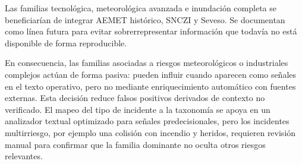 Las familias tecnológica, meteorológica avanzada e inundación completa se beneficiarían
de integrar AEMET histórico, SNCZI y Seveso. Se documentan como
línea futura para evitar sobrerrepresentar información que todavía no está disponible
de forma reproducible.

En consecuencia, las familias asociadas a riesgos meteorológicos o industriales
complejos actúan de forma pasiva: pueden influir cuando aparecen como señales
en el texto operativo, pero no mediante enriquecimiento automático con fuentes externas.
Esta decisión reduce falsos positivos derivados de contexto no verificado. El mapeo del
tipo de incidente a la taxonomía se apoya en un analizador textual optimizado para
señales predecisionales, pero los incidentes multirriesgo, por ejemplo una colisión con
incendio y heridos, requieren revisión manual para confirmar que la familia dominante no
oculta otros riesgos relevantes.
